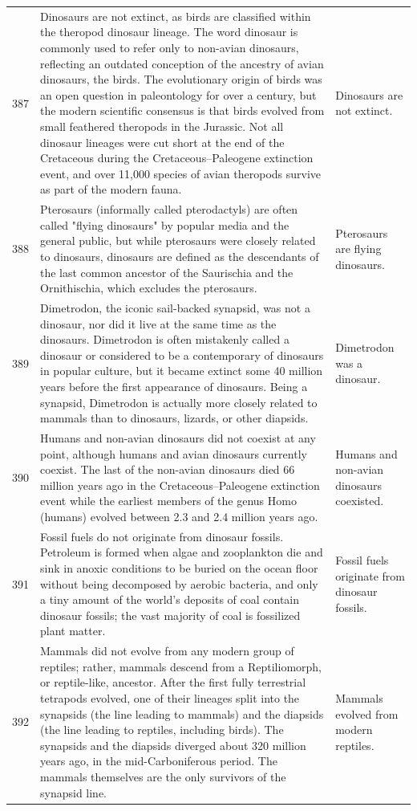 \begin{tabular}{c|p{}|p{}}
387 & Dinosaurs are not extinct, as birds are classified within the theropod dinosaur lineage. The word dinosaur is commonly used to refer only to non-avian dinosaurs, reflecting an outdated conception of the ancestry of avian dinosaurs, the birds. The evolutionary origin of birds was an open question in paleontology for over a century, but the modern scientific consensus is that birds evolved from small feathered theropods in the Jurassic. Not all dinosaur lineages were cut short at the end of the Cretaceous during the Cretaceous–Paleogene extinction event, and over 11,000 species of avian theropods survive as part of the modern fauna. & Dinosaurs are not extinct. \\
388 & Pterosaurs (informally called pterodactyls) are often called "flying dinosaurs" by popular media and the general public, but while pterosaurs were closely related to dinosaurs, dinosaurs are defined as the descendants of the last common ancestor of the Saurischia and the Ornithischia, which excludes the pterosaurs. & Pterosaurs are flying dinosaurs. \\
389 & Dimetrodon, the iconic sail-backed synapsid, was not a dinosaur, nor did it live at the same time as the dinosaurs. Dimetrodon is often mistakenly called a dinosaur or considered to be a contemporary of dinosaurs in popular culture, but it became extinct some 40 million years before the first appearance of dinosaurs. Being a synapsid, Dimetrodon is actually more closely related to mammals than to dinosaurs, lizards, or other diapsids. & Dimetrodon was a dinosaur. \\
390 & Humans and non-avian dinosaurs did not coexist at any point, although humans and avian dinosaurs currently coexist. The last of the non-avian dinosaurs died 66 million years ago in the Cretaceous–Paleogene extinction event while the earliest members of the genus Homo (humans) evolved between 2.3 and 2.4 million years ago. & Humans and non-avian dinosaurs coexisted. \\
391 & Fossil fuels do not originate from dinosaur fossils. Petroleum is formed when algae and zooplankton die and sink in anoxic conditions to be buried on the ocean floor without being decomposed by aerobic bacteria, and only a tiny amount of the world's deposits of coal contain dinosaur fossils; the vast majority of coal is fossilized plant matter. & Fossil fuels originate from dinosaur fossils. \\
392 & Mammals did not evolve from any modern group of reptiles; rather, mammals descend from a Reptiliomorph, or reptile-like, ancestor. After the first fully terrestrial tetrapods evolved, one of their lineages split into the synapsids (the line leading to mammals) and the diapsids (the line leading to reptiles, including birds). The synapsids and the diapsids diverged about 320 million years ago, in the mid-Carboniferous period. The mammals themselves are the only survivors of the synapsid line. & Mammals evolved from modern reptiles. \\

\end{tabular}
